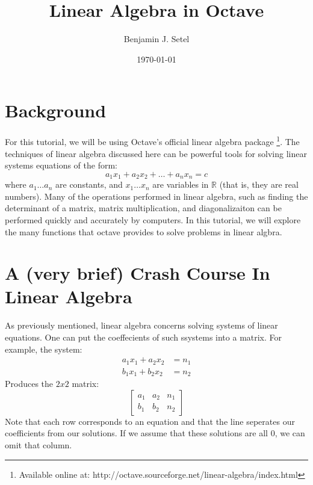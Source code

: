 \documentclass{article}
\title{Linear Algebra in Octave}
\author{Benjamin J. Setel}
\date{\today}
\begin{document}
\pagestyle{fancy}

\maketitle{}
\tableofcontents{}

\section{Background}
For this tutorial, we will be using Octave's official linear algebra package \footnote{Available online at: http://octave.sourceforge.net/linear-algebra/index.html}. The techniques of linear algebra discussed here can be powerful tools for solving linear systems equations of the form:
\[a_1x_1+a_2x_2+\ldots+a_nx_n=c\] where $a_1 \ldots a_n$ are constants, and $x_1 \ldots x_n$ are variables in $\mathbb{R}$ (that is, they are real numbers).  Many of the operations performed in linear algebra, such as finding the determinant of a matrix, matrix multiplication, and diagonalizaiton can be performed quickly and accurately by computers.  In this tutorial, we will explore the many functions that octave provides to solve problems in linear algbra.
\section{A (very brief) Crash Course In Linear Algebra}
As previously mentioned, linear algebra concerns solving systems of linear equations.   One can put the coeffecients of such ssystems into a matrix.  For example, the system:
\begin{align*}
a_1x_1+a_2x_2 &= n_1 \\
b_1x_1+b_2x_2 &= n_2
\end{align*}
Produces the $2x2$ matrix:
\[
\left[
\begin{array}{cc|c}
a_1 & a_2 & n_1 \\
b_1 & b_2 & n_2 
 \end{array}
 \right]
\]
Note that each row corresponds to an equation and that the line seperates our coefficients from our solutions.  If we assume that these solutions are all 0, we can omit that column.
\end{document}

